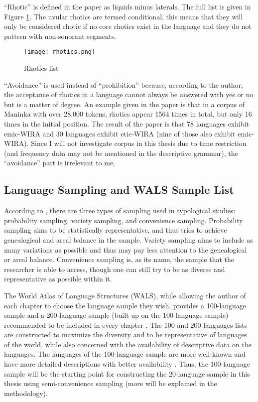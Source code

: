 \par
``Rhotic'' is defined in the paper as liquids minus laterals. The full list is given in Figure \ref{fig:rhotics}. 
The uvular rhotics are termed conditional, this means that they will only be considered rhotic if no core rhotics exist in the language and they do not pattern with non-sonorant segments.

\begin{figure}[h]
    \centering
    \texttt{[image: rhotics.png]}
    \caption{Rhotics list \citep[p.~4]{labrune2021word}}
    \label{fig:rhotics}
\end{figure}

``Avoidance'' is used instead of ``prohibition'' because, according to the author, the acceptance of rhotics in a language cannot always be answered with yes or no but is a matter of degree. An example given in the paper is that in a corpus of Maninka with over 28.000 tokens, rhotics appear 1564 times in total, but only 16 times in the initial position. The result of the paper is that 78 languages exhibit emic-WIRA and 30 languages exhibit etic-WIRA (nine of those also exhibit emic-WIRA). Since I will not investigate corpus in this thesis due to time restriction (and frequency data may not be mentioned in the descriptive grammar), the ``avoidance'' part is irrelevant to me.

\subsection{Language Sampling and WALS Sample List}

According to \citet{velupillai2012introduction}, there are three types of sampling used in typological studies: probability sampling, variety sampling, and convenience sampling. Probability sampling aims to be statistically representative, and thus tries to achieve genealogical and areal balance in the sample. Variety sampling aims to include as many variations as possible and thus may pay less attention to the genealogical or areal balance. Convenience sampling is, as its name, the sample that the researcher is able to access, though one can still try to be as diverse and representative as possible within it.

\par 
The World Atlas of Language Structures (WALS), while allowing the author of each chapter to choose the language sample they wish, provides a 100-language sample and a 200-language sample (built up on the 100-language sample) recommended to be included in every chapter \citep{wals-s1}. The 100 and 200 languages lists are constructed to maximize the diversity and to be representative of languages of the world, while also concerned with the availability of descriptive data on the languages. The languages of the 100-language sample are more well-known and have more detailed descriptions with better availability \citep{wals-s1}. Thus, the 100-language sample will be the starting point for constructing the 20-language sample in this thesis using semi-convenience sampling (more will be explained in the methodology).  

